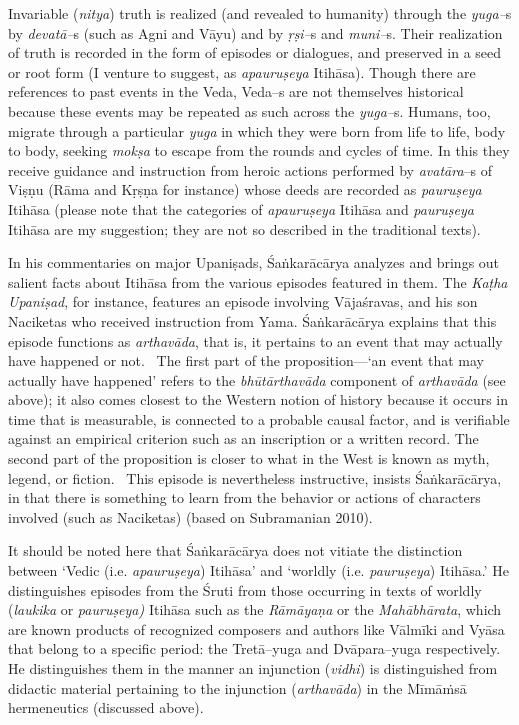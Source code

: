 Invariable (\textit{nitya}) truth is realized (and revealed to humanity) through the \textit{yuga–}s by \textit{devatā–}s (such as Agni and Vāyu) and by \textit{ṛṣi–}s and \textit{muni–}s. Their realization of truth is recorded in the form of episodes or dialogues, and preserved in a seed or root form (I venture to suggest, as \textit{apauruṣeya} Itihāsa). Though there are references to past events in the Veda, Veda–s are not themselves historical because these events may be repeated as such across the \textit{yuga–}s. Humans, too, migrate through a particular \textit{yuga} in which they were born from life to life, body to body, seeking \textit{mokṣa} to escape from the rounds and cycles of time. In this they receive guidance and instruction from heroic actions performed by \textit{avatāra}–s of Viṣṇu (Rāma and Kṛṣṇa for instance) whose deeds are recorded as \textit{pauruṣeya} Itihāsa (please note that the categories of \textit{apauruṣeya} Itihāsa and \textit{pauruṣeya} Itihāsa are my suggestion; they are not so described in the traditional texts).

In his commentaries on major Upaniṣads, Śaṅkarācārya analyzes and brings out salient facts about Itihāsa from the various episodes featured in them. The \textit{Kaṭha Upaniṣad}, for instance, features an episode involving Vājaśravas, and his son Naciketas who received instruction from Yama. Śaṅkarācārya explains that this episode functions as \textit{arthavāda}, that is, it pertains to an event that may actually have happened or not.  The first part of the proposition—‘an event that may actually have happened’ refers to the \textit{bhūtārthavāda} component of \textit{arthavāda} (see above); it also comes closest to the Western notion of history because it occurs in time that is measurable, is connected to a probable causal factor, and is verifiable against an empirical criterion such as an inscription or a written record. The second part of the proposition is closer to what in the West is known as myth, legend, or fiction.  This episode is nevertheless instructive, insists Śaṅkarācārya, in that there is something to learn from the behavior or actions of characters involved (such as Naciketas) (based on Subramanian 2010).

It should be noted here that Śaṅkarācārya does not vitiate the distinction between ‘Vedic (i.e. \textit{apauruṣeya}) Itihāsa’ and ‘worldly (i.e. \textit{pauruṣeya}) Itihāsa.’ He distinguishes episodes from the Śruti from those occurring in texts of worldly (\textit{laukika} or \textit{pauruṣeya)} Itihāsa such as the \textit{Rāmāyaṇa} or the \textit{Mahābhārata}, which are known products of recognized composers and authors like Vālmīki and Vyāsa that belong to a specific period: the Tretā–yuga and Dvāpara–yuga respectively. He distinguishes them in the manner an injunction (\textit{vidhi}) is distinguished from didactic material pertaining to the injunction (\textit{arthavāda}) in the Mīmāṁsā hermeneutics (discussed above).


